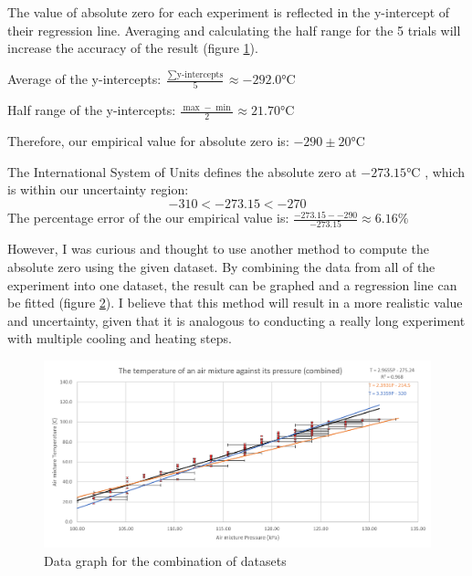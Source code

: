 \documentclass[a4paper,12pt]{article}
\begin{document}
The value of absolute zero for each experiment is reflected in the y-intercept of their regression line. Averaging and calculating the half range for the 5 trials will increase the accuracy of the result (figure \ref{fig:yi}).

\begin{figure}[H]
    \centering
    \label{fig:yi}
\end{figure}


Average of the y-intercepts: $\frac{\sum \text{y-intercepts}}{5} \approx -292.0 \si{\celsius}$

Half range of the y-intercepts: $\frac{\max - \min}{2} \approx 21.70 \si{\celsius}$

Therefore, our empirical value for absolute zero is: $-290 \pm 20 \si{\celsius}$

The International System of Units defines the absolute zero at $-273.15\si{\celsius}$ \parencite{si_form}, which is within our uncertainty region: \[-310 < -273.15 < -270\] The percentage error of the our empirical value is: $\frac{-273.15- -290}{-273.15} \approx 6.16\%$

However, I was curious and thought to use another method to compute the absolute zero using the given dataset. By combining the data from all of the experiment into one dataset, the result can be graphed and a regression line can be fitted (figure \ref{fig:comb}). I believe that this method will result in a more realistic value and uncertainty, given that it is analogous to conducting a really long experiment with multiple cooling and heating steps.

\begin{figure}[H]
    \centering
    \includegraphics[width=\textwidth]{assets/combinedgraph.png}
    \caption{Data graph for the combination of datasets}
    \label{fig:comb}
\end{figure}
\end{document}
